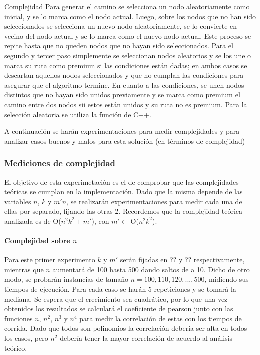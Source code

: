 \begin{subsection}{Complejidad}
Para generar el camino se selecciona un nodo aleatoriamente como inicial, y se lo marca como el nodo actual. Luego, sobre los nodos que no han sido seleccionados se selecciona un nuevo nodo aleatoriamente, se lo convierte en vecino del nodo actual y se lo marca como el nuevo nodo actual. Este proceso se repite hasta que no queden nodos que no hayan sido seleccionados. Para el segundo y tercer paso simplemente se seleccionan nodos aleatorios y se los une o marca su ruta como premium si las condiciones están dadas; en ambos casos se descartan aquellos nodos seleccionados y que no cumplan las condiciones para asegurar que el algoritmo termine. En cuanto a las condiciones, se unen nodos distintos que no hayan sido unidos previamente y se marca como premium el camino entre dos nodos sii estos están unidos y su ruta no es premium.
Para la selecci\'{o}n aleatoria se utiliza la funci\'{o}n  de C++.

A continuación se harán experimentaciones para medir complejidades y para analizar casos buenos y malos para esta solución (en términos de complejidad)

\subsubsection{Mediciones de complejidad}

El objetivo de esta experimetaci\'{o}n es el de comprobar que las complejidades te\'{o}ricas se cumplan en la implementaci\'{o}n. Dado que la misma depende de las variables $n$, $k$ y $m'n$, se realizarán experimentaciones para medir cada una de ellas por separado, fijando las otras 2. Recordemos que la complejidad teórica analizada es de O($n^2k^2 + m'$), con $m' \in$ O($n^2k^2$).

\paragraph{Complejidad sobre $n$}

Para este primer experimento $k$ y $m'$ serán fijadas en ?? y ?? respectivamente, mientras que $n$ aumentará de 100 hasta 500 dando saltos de a 10. Dicho de otro modo, se probarán instancias de tamaño $n = 100, 110, 120, ..., 500$, midiendo sus tiempos de ejecución. Para cada caso se harán 5 repeticiones y se tomará la mediana. Se espera que el crecimiento sea cuadrático, por lo que una vez obtenidos los resultados se calculará el coeficiente de pearson junto con las funciones $n$, $n^2$, $n^3$ y $n^4$ para medir la correlación de estas con los tiempos de corrida. Dado que todos son polinomios la correlación debería ser alta en todos los casos, pero $n^2$ debería tener la mayor correlación de acuerdo al análisis teórico. 


\end{subsection}
